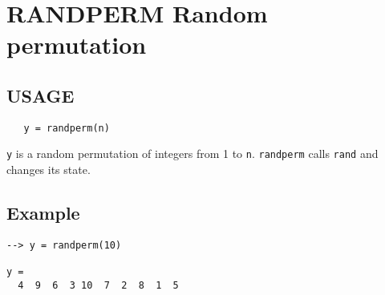 \section{RANDPERM Random permutation}

\subsection{USAGE}

\begin{verbatim}
   y = randperm(n)
\end{verbatim}
\verb|y| is a random permutation of integers from 1 to \verb|n|.
\verb|randperm| calls \verb|rand| and changes its state.
\subsection{Example}

\begin{verbatim}
--> y = randperm(10)

y = 
  4  9  6  3 10  7  2  8  1  5 
\end{verbatim}
